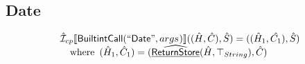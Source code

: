 \subsection{Date}
\[
\begin{array}{l}
\hat{\mathcal{I}} _{cp}\llbracket \mbox{\textsf{BuiltintCall}}(``\mbox{\textsf{Date}}",args_{})\rrbracket((\hat{H},\hat{C}), \hat{S})
  = ((\hat{H}_1, \hat{C_1}), \hat{S})\\
\quad{\rm where}\begin{array}[t]{l}
  (\hat{H}_1, \hat{C}_1) = (\widehat{\underline{\sf ReturnStore}}(\hat{H},\top_{String}), \hat{C})\\
  \end{array}\\
\\\\


\end{array}
\]

\[
\begin{array}{l}


\end{array}\]
